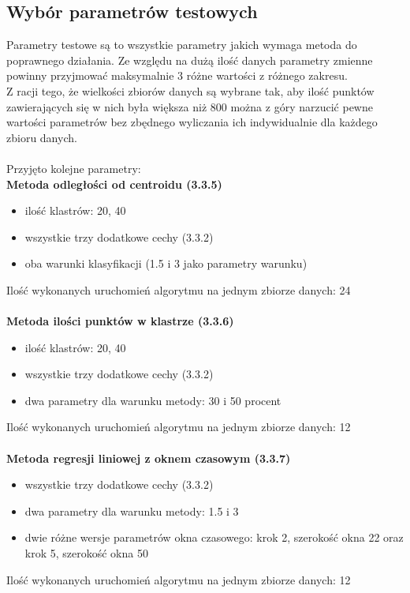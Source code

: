 \documentclass[eng,printmode]{mgr}
\begin{document}
\subsection{Wybór parametrów testowych}
Parametry testowe są to wszystkie parametry jakich wymaga metoda do poprawnego działania. Ze względu na dużą ilość danych parametry zmienne powinny przyjmować maksymalnie 3 różne wartości z różnego zakresu.\\
Z racji tego, że wielkości zbiorów danych są wybrane tak, aby ilość punktów zawierających się w nich była większa niż 800 można z góry narzucić pewne wartości parametrów bez zbędnego wyliczania ich indywidualnie dla każdego zbioru danych.
\\\\
Przyjęto kolejne parametry:\\
\textbf{Metoda odległości od centroidu (3.3.5)}
\begin{itemize}
	\item ilość klastrów: 20, 40
	\item wszystkie trzy dodatkowe cechy (3.3.2)
	\item oba warunki klasyfikacji (1.5 i 3 jako parametry warunku)
\end{itemize}
Ilość wykonanych uruchomień algorytmu na jednym zbiorze danych: 24
\\\\
\textbf{Metoda ilości punktów w klastrze (3.3.6)}
\begin{itemize}
	\item ilość klastrów: 20, 40
	\item wszystkie trzy dodatkowe cechy (3.3.2)
	\item dwa parametry dla warunku metody: 30 i 50 procent
\end{itemize}
Ilość wykonanych uruchomień algorytmu na jednym zbiorze danych: 12
\\\\
\textbf{Metoda regresji liniowej z oknem czasowym (3.3.7)}
\begin{itemize}
	\item wszystkie trzy dodatkowe cechy (3.3.2)
	\item dwa parametry dla warunku metody: 1.5 i 3
	\item dwie różne wersje parametrów okna czasowego: krok 2, szerokość okna 22 oraz krok 5, szerokość okna 50
\end{itemize}
Ilość wykonanych uruchomień algorytmu na jednym zbiorze danych: 12
\\\\
\end{document}
